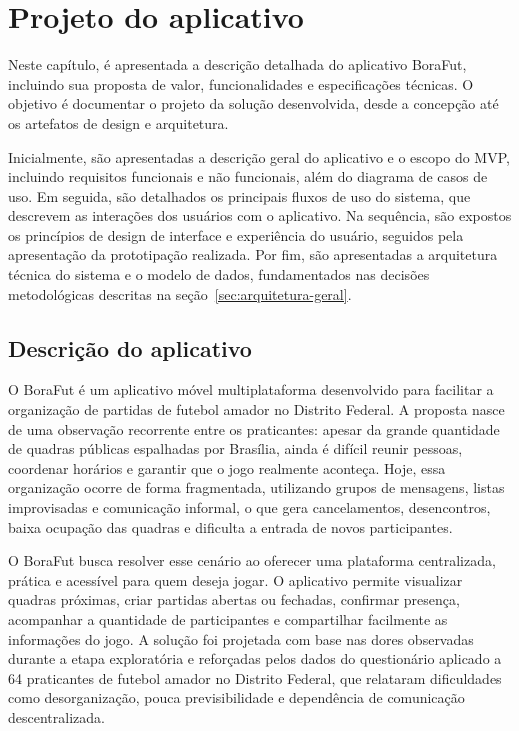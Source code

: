 \chapter{Projeto do aplicativo}

    Neste capítulo, é apresentada a descrição detalhada do aplicativo BoraFut, incluindo sua proposta de valor, funcionalidades e especificações técnicas. O objetivo é documentar o projeto da solução desenvolvida, desde a concepção até os artefatos de design e arquitetura.

    Inicialmente, são apresentadas a descrição geral do aplicativo e o escopo do MVP, incluindo requisitos funcionais e não funcionais, além do diagrama de casos de uso. Em seguida, são detalhados os principais fluxos de uso do sistema, que descrevem as interações dos usuários com o aplicativo. Na sequência, são expostos os princípios de design de interface e experiência do usuário, seguidos pela apresentação da prototipação realizada. Por fim, são apresentadas a arquitetura técnica do sistema e o modelo de dados, fundamentados nas decisões metodológicas descritas na seção~\ref{sec:arquitetura-geral}.

\section{Descrição do aplicativo}

  O BoraFut é um aplicativo móvel multiplataforma desenvolvido para facilitar a organização de partidas de futebol amador no Distrito Federal. A proposta nasce de uma observação recorrente entre os praticantes: apesar da grande quantidade de quadras públicas espalhadas por Brasília, ainda é difícil reunir pessoas, coordenar horários e garantir que o jogo realmente aconteça. Hoje, essa organização ocorre de forma fragmentada, utilizando grupos de mensagens, listas improvisadas e comunicação informal, o que gera cancelamentos, desencontros, baixa ocupação das quadras e dificulta a entrada de novos participantes.

  O BoraFut busca resolver esse cenário ao oferecer uma plataforma centralizada, prática e acessível para quem deseja jogar. O aplicativo permite visualizar quadras próximas, criar partidas abertas ou fechadas, confirmar presença, acompanhar a quantidade de participantes e compartilhar facilmente as informações do jogo. A solução foi projetada com base nas dores observadas durante a etapa exploratória e reforçadas pelos dados do questionário aplicado a 64 praticantes de futebol amador no Distrito Federal, que relataram dificuldades como desorganização, pouca previsibilidade e dependência de comunicação descentralizada.

